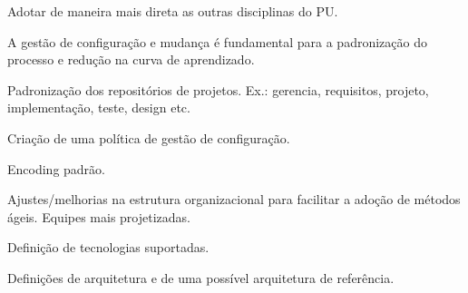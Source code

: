 \documentclass[
	article,			%
	11pt,				%
	oneside,			%
	a4paper,			%
	english,			%
	brazil,				%
	sumario=tradicional
	]{abntex2}
\begin{document}
Adotar de maneira mais direta as outras disciplinas do PU.

A gestão de configuração e mudança é fundamental para a padronização do processo
e redução na curva de aprendizado.

Padronização dos repositórios de projetos. Ex.: gerencia, requisitos, projeto,
implementação, teste, design etc.

Criação de uma política de gestão de configuração.

Encoding padrão.

Ajustes/melhorias na estrutura organizacional para facilitar a adoção de
métodos ágeis. Equipes mais projetizadas.

Definição de tecnologias suportadas.

Definições de arquitetura e de uma possível arquitetura de referência.

\postextual


\end{document}
